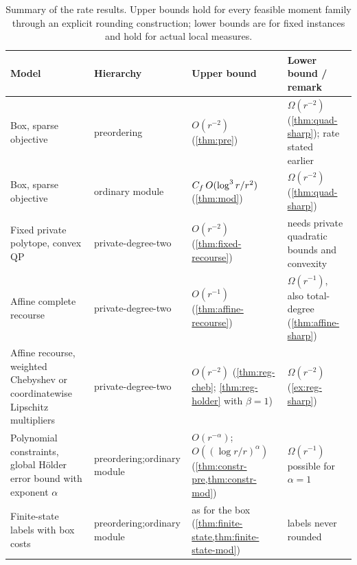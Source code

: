 \begin{table}[t]
\centering
\small
\begin{tabular}{@{}>{\raggedright\arraybackslash}p{}>{\raggedright\arraybackslash}p{}>{\raggedright\arraybackslash}p{}>{\raggedright\arraybackslash}p{}@{}}
\toprule
Model & Hierarchy & Upper bound & Lower bound / remark\\
\midrule
Box, sparse objective & preordering & $O(r^{-2})$ (\cref{thm:pre}) & $\Omega(r^{-2})$ (\cref{thm:quad-sharp}); rate stated earlier~\cite{magron2025slides-lorentz}\\[3pt]
Box, sparse objective & ordinary module & $C_f\,O(\log^3r/r^2)$ (\cref{thm:mod}) & $\Omega(r^{-2})$ (\cref{thm:quad-sharp})\\[3pt]
Fixed private polytope, convex QP & private-degree-two & $O(r^{-2})$ (\cref{thm:fixed-recourse}) & needs private quadratic bounds and convexity\\[3pt]
Affine complete recourse & private-degree-two & $O(r^{-1})$ (\cref{thm:affine-recourse}) & $\Omega(r^{-1})$, also total-degree (\cref{thm:affine-sharp})\\[3pt]
Affine recourse, weighted Chebyshev or coordinatewise Lipschitz multipliers & private-degree-two & $O(r^{-2})$ (\cref{thm:reg-cheb}; \cref{thm:reg-holder} with $\beta=1$) & $\Omega(r^{-2})$ (\cref{ex:reg-sharp})\\[3pt]
Polynomial constraints, global Hölder error bound with exponent $\alpha$ & preordering;\newline ordinary module & $O(r^{-\alpha})$;\newline $O((\log r/r)^\alpha)$ (\cref{thm:constr-pre,thm:constr-mod}) & $\Omega(r^{-1})$ possible for $\alpha=1$\\[3pt]
Finite-state labels with box costs & preordering;\newline ordinary module & as for the box (\cref{thm:finite-state,thm:finite-state-mod}) & labels never rounded\\[3pt]
\bottomrule
\end{tabular}
\caption{Summary of the rate results. Upper bounds hold for every feasible
moment family through an explicit rounding construction; lower bounds are
for fixed instances and hold for actual local measures.}
\label{tab:intro-results}
\end{table}


